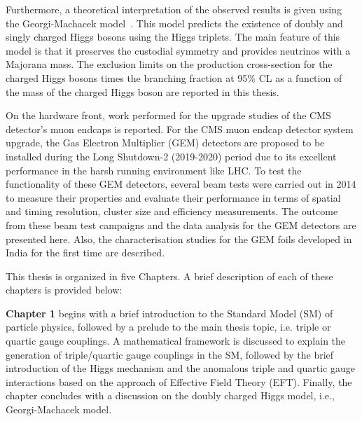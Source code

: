 Furthermore, a theoretical interpretation of the observed results is given using the Georgi-Machacek model~\cite{GEORGI1985463}. This model predicts the existence of doubly and singly charged Higgs bosons using the Higgs triplets. The main feature of this model is that it preserves the custodial symmetry and provides neutrinos with a Majorana mass. The exclusion limits on the production cross-section for the charged Higgs bosons times the branching fraction at 95\% CL as a function of the mass of the charged Higgs boson are reported in this thesis.

On the hardware front, work performed for the upgrade studies of the CMS detector's muon endcaps is reported. For the CMS muon endcap detector system upgrade, the Gas Electron Multiplier (GEM) detectors are proposed to be installed during the Long Shutdown-2 (2019-2020) period due to its excellent performance in the harsh running environment like LHC. To test the functionality of these GEM detectors, several beam tests were carried out in 2014 to measure their properties and evaluate their performance in terms of spatial and timing resolution, cluster size and efficiency measurements. The outcome from these beam test campaigns and the data analysis for the GEM detectors are presented here. Also, the characterisation studies for the GEM foils developed in India for the first time are described.

This thesis is organized in five Chapters. A brief description of each of these chapters is provided below:

\textbf{Chapter 1} begins with a brief introduction to the Standard Model (SM) of particle physics, followed by a prelude to the main thesis topic, i.e. triple or quartic gauge couplings. A mathematical framework is discussed to explain the generation of triple/quartic gauge couplings in the SM, followed by the brief introduction of the Higgs mechanism and the anomalous triple and quartic gauge interactions based on the approach of Effective Field Theory (EFT). Finally, the chapter concludes with a discussion on the doubly charged Higgs model, i.e., Georgi-Machacek model.

